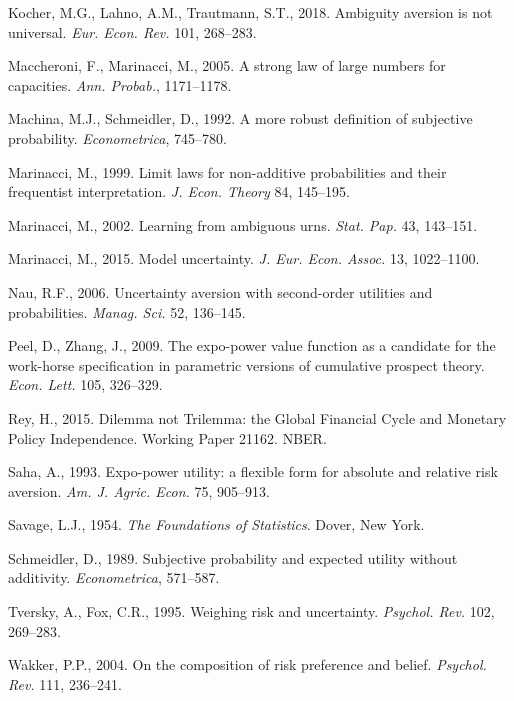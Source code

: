 \documentclass[12pt,a4paper]{article}
\newenvironment{original}
  {\par\vspace{0.5em}\noindent\color{black}\ignorespaces}
  {\par\vspace{0.3em}}
\begin{document}
\begin{original}
\vspace{0.3em}
\noindent Kocher, M.G., Lahno, A.M., Trautmann, S.T., 2018. Ambiguity aversion is not universal. \textit{Eur. Econ. Rev.} 101, 268--283.

\vspace{0.3em}
\noindent Maccheroni, F., Marinacci, M., 2005. A strong law of large numbers for capacities. \textit{Ann. Probab.}, 1171--1178.

\vspace{0.3em}
\noindent Machina, M.J., Schmeidler, D., 1992. A more robust definition of subjective probability. \textit{Econometrica}, 745--780.

\vspace{0.3em}
\noindent Marinacci, M., 1999. Limit laws for non-additive probabilities and their frequentist interpretation. \textit{J. Econ. Theory} 84, 145--195.

\vspace{0.3em}
\noindent Marinacci, M., 2002. Learning from ambiguous urns. \textit{Stat. Pap.} 43, 143--151.

\vspace{0.3em}
\noindent Marinacci, M., 2015. Model uncertainty. \textit{J. Eur. Econ. Assoc.} 13, 1022--1100.

\vspace{0.3em}
\noindent Nau, R.F., 2006. Uncertainty aversion with second-order utilities and probabilities. \textit{Manag. Sci.} 52, 136--145.

\vspace{0.3em}
\noindent Peel, D., Zhang, J., 2009. The expo-power value function as a candidate for the work-horse specification in parametric versions of cumulative prospect theory. \textit{Econ. Lett.} 105, 326--329.

\vspace{0.3em}
\noindent Rey, H., 2015. Dilemma not Trilemma: the Global Financial Cycle and Monetary Policy Independence. Working Paper 21162. NBER.

\vspace{0.3em}
\noindent Saha, A., 1993. Expo-power utility: a flexible form for absolute and relative risk aversion. \textit{Am. J. Agric. Econ.} 75, 905--913.

\vspace{0.3em}
\noindent Savage, L.J., 1954. \textit{The Foundations of Statistics}. Dover, New York.

\vspace{0.3em}
\noindent Schmeidler, D., 1989. Subjective probability and expected utility without additivity. \textit{Econometrica}, 571--587.

\vspace{0.3em}
\noindent Tversky, A., Fox, C.R., 1995. Weighing risk and uncertainty. \textit{Psychol. Rev.} 102, 269--283.

\vspace{0.3em}
\noindent Wakker, P.P., 2004. On the composition of risk preference and belief. \textit{Psychol. Rev.} 111, 236--241.
\end{original}
\end{document}
